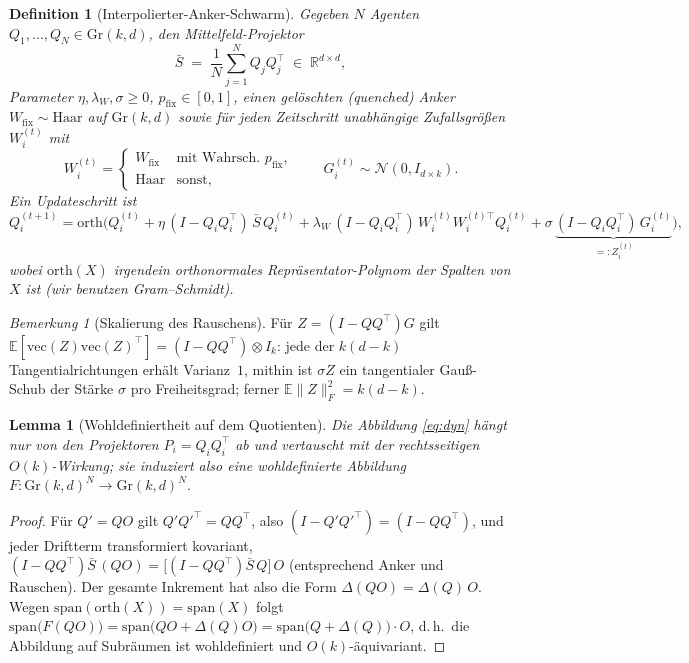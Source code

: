 \documentclass[11pt,a4paper]{article}
\newtheorem{lemma}[satz]{Lemma}
\newtheorem{definition}[satz]{Definition}
\theoremstyle{remark}
\newtheorem{bemerkung}{Bemerkung}
\newcommand{\Gr}{\mathrm{Gr}}
\newcommand{\E}{\mathbb{E}}
\newcommand{\R}{\mathbb{R}}
\begin{document}
\begin{definition}[Interpolierter-Anker-Schwarm]\label{def:modell}
Gegeben $N$ Agenten $Q_1,\dots,Q_N\in\Gr(k,d)$, den Mittelfeld-Projektor
\[
\bar S \;=\;\frac1N\sum_{j=1}^N Q_j Q_j^\top \;\in\;\R^{d\times d},
\]
Parameter $\eta,\lambda_W,\sigma\ge0$, $p_{\mathrm{fix}}\in[0,1]$, einen
\emph{gelöschten} (quenched) Anker $W_{\mathrm{fix}}\sim\mathrm{Haar}$ auf
$\Gr(k,d)$ sowie für jeden Zeitschritt unabhängige Zufallsgrößen
$W_i^{(t)}$ mit
\[
W_i^{(t)}=\begin{cases}W_{\mathrm{fix}} & \text{mit Wahrsch.~}p_{\mathrm{fix}},\\
\mathrm{Haar} & \text{sonst,}\end{cases}
\qquad
G_i^{(t)}\sim\mathcal N(0,I_{d\times k}).
\]
Ein Updateschritt ist
\begin{equation}\label{eq:dyn}
Q_i^{(t+1)}=\mathrm{orth}\Big(
Q_i^{(t)}
+\eta\,(I-Q_iQ_i^{\top})\,\bar S\,Q_i^{(t)}
+\lambda_W\,(I-Q_iQ_i^{\top})\,W_i^{(t)}W_i^{(t)\top}Q_i^{(t)}
+\sigma\,\underbrace{(I-Q_iQ_i^{\top})\,G_i^{(t)}}_{=:Z_i^{(t)}}
\Big),
\end{equation}
wobei $\mathrm{orth}(X)$ irgendein orthonormales Repräsentator-Polynom der
Spalten von $X$ ist (wir benutzen Gram--Schmidt).
\end{definition}

\begin{bemerkung}[Skalierung des Rauschens]
Für $Z=(I-QQ^\top)G$ gilt $\E[\mathrm{vec}(Z)\mathrm{vec}(Z)^\top]
=(I-QQ^\top)\otimes I_k$: jede der $k(d-k)$ Tangentialrichtungen erhält
Varianz~$1$, mithin ist $\sigma Z$ ein tangentialer Gauß-Schub der
Stärke $\sigma$ pro Freiheitsgrad; ferner
$\E\|Z\|_F^2=k(d-k)$.
\end{bemerkung}

\begin{lemma}[Wohldefiniertheit auf dem Quotienten]\label{lem:quot}
Die Abbildung \eqref{eq:dyn} hängt nur von den Projektoren
$P_i=Q_iQ_i^\top$ ab und vertauscht mit der rechtsseitigen
$O(k)$-Wirkung; sie induziert also eine wohldefinierte Abbildung
$F\colon\Gr(k,d)^N\to\Gr(k,d)^N$.
\end{lemma}
\begin{proof}
Für $Q' = QO$ gilt $Q'Q'^\top = QQ^\top$, also
$(I-Q'Q'^\top)=(I-QQ^\top)$, und jeder Driftterm transformiert kovariant,
$(I-QQ^\top)\bar S\,(QO) = \big[(I-QQ^\top)\bar S\,Q\big]\,O$ (entsprechend
Anker und Rauschen). Der gesamte Inkrement hat also die Form
$\Delta(QO)=\Delta(Q)\,O$. Wegen $\mathrm{span}(\mathrm{orth}(X))=\mathrm{span}(X)$
folgt
$\mathrm{span}\big(F(QO)\big)=\mathrm{span}\big(QO+\Delta(Q)O\big)
=\mathrm{span}\big(Q+\Delta(Q)\big)\cdot O$, d.\,h.\ die Abbildung auf
Subräumen ist wohldefiniert und $O(k)$-äquivariant.
\end{proof}
\end{document}

